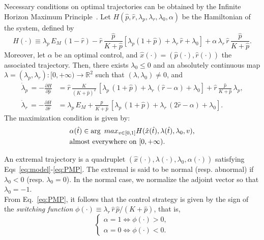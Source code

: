 Necessary conditions on optimal trajectories can be obtained by the Infinite Horizon Maximum Principle~\cite{carlson_infinite_1991}.
Let $H(\hat{p},\hat{r},\lambda_p,\lambda_r,\lambda_0,\alpha)$ be the Hamiltonian of the system, defined by
\[
H(\cdot) \equiv \lambda_p\, E_M\, (1-\hat{r}) - \hat{r}\, \dfrac{\hat{p}}{K+\hat{p}}\left[\lambda_p (1+\hat{p}) +\lambda_r\, \hat{r} +\lambda_0\right] + \alpha \, \lambda_r \, \hat{r}\, \frac{\hat{p}}{K+\hat{p}}.
\]
Moreover, let $\alpha$ be an optimal control, and $\hat{x}(\cdot)=(\hat{p}(\cdot),\hat{r}(\cdot))$ the associated trajectory.
Then, there exists $\lambda_0 \leq 0$ and an absolutely continuous map $\lambda=(\lambda_p,\lambda_r):[0,+\infty) \rightarrow \mathbb{R}^2$
such that $(\lambda,\lambda_0)\neq0$, and
\begin{align}
\dot{\lambda}_p\, =-\frac{\partial H}{\partial \hat p}&= \hat{r} \, \frac{K}{(K+\hat{p})^2}\, \left[\lambda_p \, (1+\hat{p}) +\lambda_r\, ( \hat{r}-\alpha) + \lambda_0\right] + \hat{r}\, \frac{\hat{p}}{K+\hat{p}}\, \lambda_p, \label{eq:adjoint_p}\\
 \dot{\lambda}_r\, =-\frac{\partial H}{\partial \hat r}&= \lambda_p\, E_M +\frac{\hat{p}}{K+\hat{p}} \, \left[\lambda_p \, (1+\hat{p}) +\lambda_r\, (2 \hat{r}-\alpha) +\lambda_0\right] \label{eq:adjoint_r}.
\end{align}
The maximization condition is given by:
\begin{equation}{\label{eq:PMP}}
\begin{aligned}
&\alpha(\hat{t}) \in \arg\ max_{v \in [0,1]} H(\hat{x}(\hat{t}),\lambda(\hat{t}),\lambda_0,v), \\ &\mathrm{almost}\ \mathrm{everywhere}\ \mathrm{on}\ [0,+\infty).
\end{aligned}
\end{equation}

An extremal trajectory is a quadruplet $(\hat{x}(\cdot),\lambda(\cdot),\lambda_0,\alpha(\cdot))$ satisfying Eqs~\ref{eq:model}-\ref{eq:PMP}. The extremal is said to be normal (resp. abnormal) if $\lambda_0<0$ (resp. $\lambda_0=0$). In the normal case, we normalize the adjoint vector so that $\lambda_0=-1$.\\

From Eq.~\ref{eq:PMP}, it follows that the control strategy is given by the sign of the \textit{switching function} $\phi(\cdot) \equiv \lambda_r \, \hat{r}\, \hat{p}/(K+\hat{p})$, that is,
\[
\begin{cases}
\alpha=1 \iff \phi(\cdot) >0,\\
\alpha=0 \iff \phi(\cdot)<0.
\end{cases}
\]

